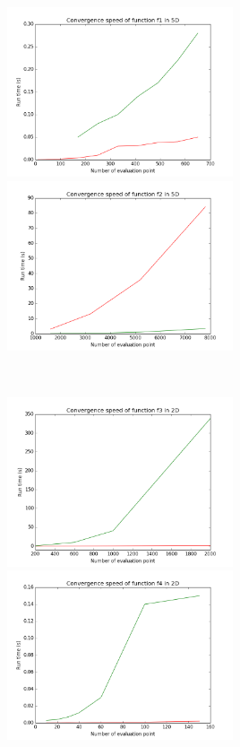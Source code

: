 \begin{center}
\begin{figure}[!h]
		\centering
		\begin{subfigure}[b]{0.3\textwidth}
				\includegraphics[width=\linewidth,height=5cm]{images/f1_5d_s.png}
				\includegraphics[width=\linewidth,height=5cm]{images/f2_5d_s.png}
		\end{subfigure}
		~
		\begin{subfigure}[b]{0.3\textwidth}
				\includegraphics[width=\linewidth,height=5cm]{images/f3_2d_s.png}
				\includegraphics[width=\linewidth,height=5cm]{images/f4_2d_s.png}
		\end{subfigure}

\end{figure}
\end{center}
